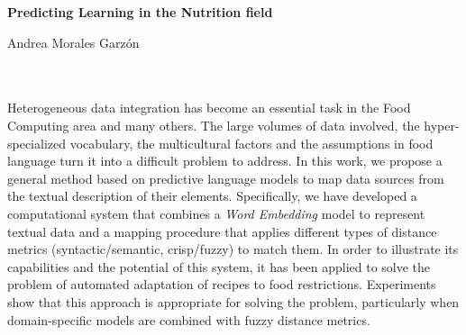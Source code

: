 \cleardoublepage



\thispagestyle{empty}


\begin{center}
{\large\bfseries Predicting Learning in the Nutrition field}\\
\end{center}
\begin{center}
Andrea Morales Garzón\\
\end{center}

\\

\vspace{0.7cm}
\\


Heterogeneous data integration has become an essential task in the Food Computing area and many others. The large volumes of data involved, the hyper-specialized vocabulary, the multicultural factors and the assumptions in food language turn it into a difficult problem to address. In this work, we propose a general method based on predictive language models to map data sources from the textual description of their elements. Specifically, we have developed a computational system that combines a \textit{Word Embedding} model to represent textual data and a mapping procedure that applies different types of distance metrics (syntactic/semantic, crisp/fuzzy) to match them. In order to illustrate its capabilities and the potential of this system, it has been applied to solve the problem of automated adaptation of recipes to food restrictions. Experiments show that this approach is appropriate for solving the problem, particularly when domain-specific models are combined with fuzzy distance metrics.






